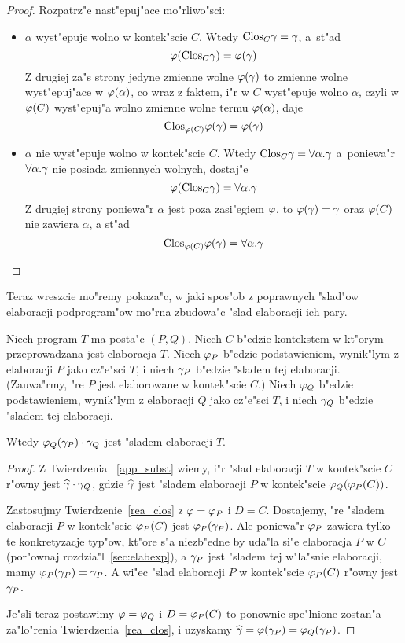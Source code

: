 \begin{proof}
Rozpatrz"e nast"epuj"ace mo"rliwo"sci:
\begin{itemize}
\item $\alpha$ wyst"epuje wolno w kontek"scie $C$.
      Wtedy ${\rm Clos}_{C}\gamma = \gamma$, a~st"ad
      $$\varphi({\rm Clos}_{C}\gamma) = \varphi(\gamma)$$
      Z drugiej za"s strony jedyne zmienne wolne $\varphi(\gamma)$ 
      to zmienne wolne wyst"epuj"ace w $\varphi(\alpha)$,
      co wraz z faktem, i"r w $C$ wyst"epuje wolno $\alpha$, 
      czyli w $\varphi(C)$ wyst"epuj"a wolno zmienne wolne termu $\varphi(\alpha)$, 
      daje $${\rm Clos}_{\varphi(C)}\varphi(\gamma) = \varphi(\gamma)$$
\item $\alpha$ nie wyst"epuje wolno w kontek"scie $C$.
      Wtedy ${\rm Clos}_{C}\gamma = \forall\alpha.\gamma$ a~poniewa"r
      $\forall\alpha.\gamma$ nie posiada zmiennych wolnych, dostaj"e      
      $$\varphi({\rm Clos}_{C}\gamma) = \forall\alpha.\gamma$$ 
      Z drugiej strony poniewa"r $\alpha$ jest poza zasi"egiem $\varphi$, 
      to $\varphi(\gamma) = \gamma$ oraz $\varphi(C)$ nie zawiera $\alpha$, a st"ad
      $${\rm Clos}_{\varphi(C)}\varphi(\gamma) = \forall\alpha.\gamma$$
\end{itemize}
\end{proof}

Teraz wreszcie mo"remy pokaza"c, w jaki spos"ob z poprawnych "slad"ow elaboracji podprogram"ow
mo"rna zbudowa"c "slad elaboracji ich pary.
\begin{thm}
\label{app}
Niech program $T$ ma posta"c $(P, Q)$.
Niech $C$ b"edzie kontekstem w kt"orym przeprowadzana jest e\-la\-bo\-ra\-cja $T$.
Niech $\varphi_P$ b"edzie podstawieniem, wynik"lym z elaboracji $P$ jako cz"e"sci $T$,
i niech $\gamma_P$ b"edzie "sladem tej elaboracji. 
(Zauwa"rmy, "re $P$ jest elaborowane w kontek"scie $C$.)
Niech $\varphi_Q$ b"edzie podstawieniem, wynik"lym z elaboracji $Q$ jako cz"e"sci $T$,
i niech $\gamma_Q$ b"edzie "sladem tej elaboracji. 

Wtedy $\varphi_Q(\gamma_P)\cdot \gamma_Q$ jest "sladem elaboracji $T$.
\end{thm}
 
\begin{proof}
Z Twierdzenia ~\ref{app_subst} wiemy, i"r "slad elaboracji $T$ w kontek"scie $C$ 
r"owny jest $\widehat{\gamma}\cdot \gamma_Q$,
gdzie $\widehat{\gamma}$ jest "sladem elaboracji $P$ w kontek"scie $\varphi_Q(\varphi_P(C))$.

Zastosujmy Twierdzenie~\ref{rea_clos} z $\varphi = \varphi_P$ i $D = C$.
Dostajemy, "re "sladem elaboracji $P$ w kontek"scie $\varphi_P(C)$ jest $\varphi_P(\gamma_P)$.
Ale poniewa"r $\varphi_P$ zawiera tylko te konkretyzacje typ"ow,
kt"ore s"a niezb"edne by uda"la si"e elaboracja $P$ w $C$ (por"ownaj rozdzia"l~\ref{sec:elabexp}),
a $\gamma_P$ jest "sladem tej w"la"snie elaboracji, mamy $\varphi_P(\gamma_P) = \gamma_P$.
A wi"ec "slad elaboracji $P$ w kontek"scie $\varphi_P(C)$ r"owny jest $\gamma_P$. 

Je"sli teraz postawimy $\varphi = \varphi_Q$ i $D = \varphi_P(C)$ to ponownie spe"lnione 
zostan"a za"lo"renia Twierdzenia~\ref{rea_clos}, i uzyskamy
$\widehat{\gamma} = \varphi(\gamma_P) = \varphi_Q(\gamma_P)$.
\end{proof}

